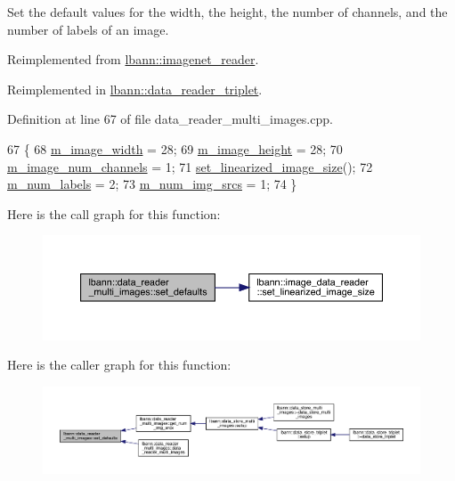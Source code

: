Set the default values for the width, the height, the number of channels, and the number of labels of an image. 



Reimplemented from \hyperlink{classlbann_1_1imagenet__reader_ad1e108315d659509a3e166c2f8a4941f}{lbann\+::imagenet\+\_\+reader}.



Reimplemented in \hyperlink{classlbann_1_1data__reader__triplet_a88bc385a2d42e9f78a768ff496036843}{lbann\+::data\+\_\+reader\+\_\+triplet}.



Definition at line 67 of file data\+\_\+reader\+\_\+multi\+\_\+images.\+cpp.


\begin{DoxyCode}
67                                             \{
68   \hyperlink{classlbann_1_1image__data__reader_af001f3d1c0f1c580b66988233b3a64f0}{m\_image\_width} = 28;
69   \hyperlink{classlbann_1_1image__data__reader_a0632efa3deaa9d61e671f741909eb3fe}{m\_image\_height} = 28;
70   \hyperlink{classlbann_1_1image__data__reader_aab1a440f361521dc7bd583cefe1061f8}{m\_image\_num\_channels} = 1;
71   \hyperlink{classlbann_1_1image__data__reader_a0164b0e3abbe92daef73b36fb925403e}{set\_linearized\_image\_size}();
72   \hyperlink{classlbann_1_1image__data__reader_af280e8758a6ec3acee7c62e6351d17e0}{m\_num\_labels} = 2;
73   \hyperlink{classlbann_1_1data__reader__multi__images_a70752a5442e99333fec52def9eadc58f}{m\_num\_img\_srcs} = 1;
74 \}
\end{DoxyCode}
Here is the call graph for this function\+:\nopagebreak
\begin{figure}[H]
\begin{center}
\leavevmode
\includegraphics[width=350pt]{classlbann_1_1data__reader__multi__images_a5abe6981d750bc145e50f6141772805c_cgraph}
\end{center}
\end{figure}
Here is the caller graph for this function\+:\nopagebreak
\begin{figure}[H]
\begin{center}
\leavevmode
\includegraphics[width=350pt]{classlbann_1_1data__reader__multi__images_a5abe6981d750bc145e50f6141772805c_icgraph}
\end{center}
\end{figure}
